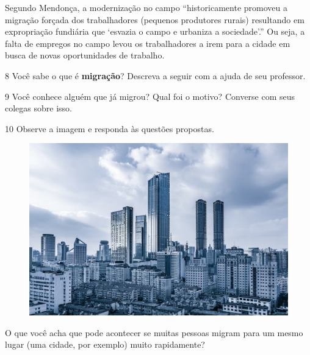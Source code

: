 Segundo Mendonça, a modernização no campo “historicamente promoveu a
migração forçada dos trabalhadores (pequenos produtores rurais)
resultando em expropriação fundiária que `esvazia o campo e urbaniza a
sociedade'.” Ou seja, a falta de empregos no campo levou os
trabalhadores a irem para a cidade em busca de novas oportunidades de
trabalho.


\num{8} Você sabe o que é \textbf{migração}? Descreva a seguir com a ajuda de seu professor.


\num{9} Você conhece alguém que já migrou? Qual foi o motivo? Converse com seus
colegas sobre isso.


\num{10} Observe a imagem e responda às questões propostas.

\begin{figure}[htpb!]
\includegraphics[width=.5\textwidth]{./imgs/img59.png}
\end{figure}

\noindent{}O que você acha que pode acontecer se muitas pessoas migram para um mesmo lugar (uma cidade, por exemplo) muito rapidamente?

